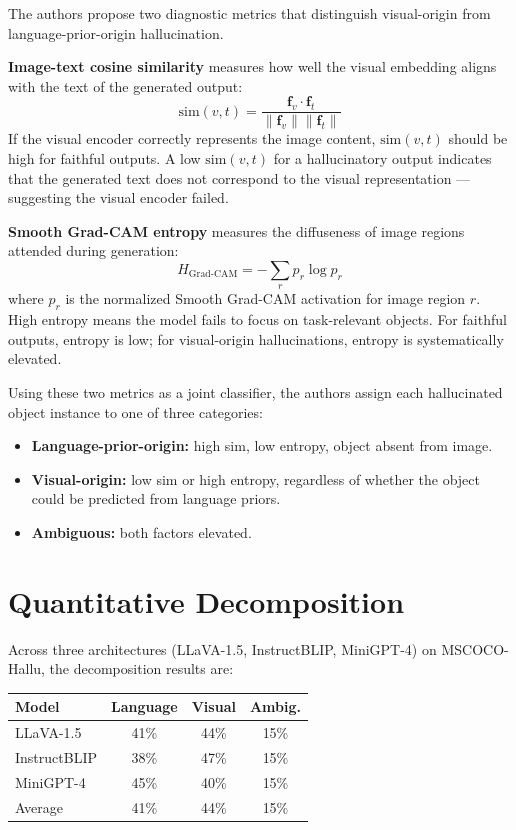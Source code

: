 \documentclass[10pt,twocolumn]{article}
\begin{document}
The authors propose two diagnostic metrics that distinguish visual-origin
from language-prior-origin hallucination.

\textbf{Image-text cosine similarity} measures how well the visual
embedding aligns with the text of the generated output:
\[
  \text{sim}(v, t) = \frac{\mathbf{f}_v \cdot \mathbf{f}_t}
                          {\|\mathbf{f}_v\| \|\mathbf{f}_t\|}
\]
If the visual encoder correctly represents the image content,
$\text{sim}(v, t)$ should be high for faithful outputs. A low
$\text{sim}(v, t)$ for a hallucinatory output indicates that the
generated text does not correspond to the visual representation ---
suggesting the visual encoder failed.

\textbf{Smooth Grad-CAM entropy} measures the diffuseness of image
regions attended during generation:
\[
  H_{\text{Grad-CAM}} = -\sum_{r} p_r \log p_r
\]
where $p_r$ is the normalized Smooth Grad-CAM activation for image
region $r$. High entropy means the model fails to focus on
task-relevant objects. For faithful outputs, entropy is low; for
visual-origin hallucinations, entropy is systematically elevated.

Using these two metrics as a joint classifier, the authors assign each
hallucinated object instance to one of three categories:
\begin{itemize}[itemsep=1pt,parsep=0pt]
  \item \textbf{Language-prior-origin:} high sim, low entropy, object
    absent from image.
  \item \textbf{Visual-origin:} low sim or high entropy, regardless of
    whether the object could be predicted from language priors.
  \item \textbf{Ambiguous:} both factors elevated.
\end{itemize}

\section{Quantitative Decomposition}

Across three architectures (LLaVA-1.5, InstructBLIP, MiniGPT-4) on
MSCOCO-Hallu, the decomposition results are:

\begin{center}
\begin{tabular}{lccc}
\toprule
Model & Language & Visual & Ambig. \\
\midrule
LLaVA-1.5      & 41\% & 44\% & 15\% \\
InstructBLIP   & 38\% & 47\% & 15\% \\
MiniGPT-4      & 45\% & 40\% & 15\% \\
\midrule
Average        & 41\% & 44\% & 15\% \\
\bottomrule
\end{tabular}
\end{center}
\end{document}
